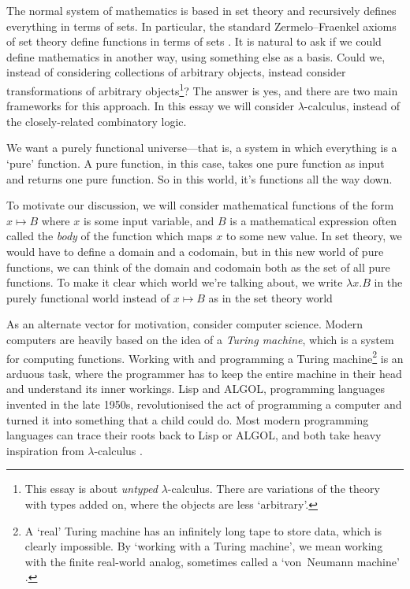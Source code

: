 \documentclass[a4paper, 11pt]{article}
\theoremstyle{plain}
\theoremstyle{definition}
\theoremstyle{remark}
\begin{document}
The normal system of mathematics is based in set theory and recursively defines everything in terms of sets. In particular, the standard Zermelo--Fraenkel axioms of set theory define functions in terms of sets \parencite[\S\S2.1--2.2]{ciesielski-1997-set-theory}. It is natural to ask if we could define mathematics in another way, using something else as a basis. Could we, instead of considering collections of arbitrary objects, instead consider transformations of arbitrary objects\footnote{This essay is about \textit{untyped} $\lambda$-calculus. There are variations of the theory with types added on, where the objects are less `arbitrary'.}? The answer is yes, and there are two main frameworks for this approach. In this essay we will consider $\lambda$-calculus, instead of the closely-related combinatory logic. %

We want a purely functional universe---that is, a system in which everything is a `pure' function. A pure function, in this case, takes one pure function as input and returns one pure function. So in this world, it's functions all the way down.

To motivate our discussion, we will consider mathematical functions of the form $x \mapsto B$ where $x$ is some input variable, and $B$ is a mathematical expression often called the \textit{body} of the function which maps $x$ to some new value. In set theory, we would have to define a domain and a codomain, but in this new world of pure functions, we can think of the domain and codomain both as the set of all pure functions. To make it clear which world we're talking about, we write $\lambda x . B$ in the purely functional world instead of $x \mapsto B$ as in the set theory world


As an alternate vector for motivation, consider computer science. Modern computers are heavily based on the idea of a \textit{Turing machine}, which is a system for computing functions. Working with and programming a Turing machine\footnote{A `real' Turing machine has an infinitely long tape to store data, which is clearly impossible. By `working with a Turing machine', we mean working with the finite real-world analog, sometimes called a `von~Neumann machine' \parencite[p.~4]{appel-feferman-2012-alan-turings-systems-of-logic}.} is an arduous task, where the programmer has to keep the entire machine in their head and understand its inner workings. Lisp and ALGOL, programming languages invented in the late 1950s, revolutionised the act of programming a computer and turned it into something that a child could do. Most modern programming languages can trace their roots back to Lisp or ALGOL, and both take heavy inspiration from $\lambda$-calculus \parencite[p.~4]{appel-feferman-2012-alan-turings-systems-of-logic}.
\end{document}
